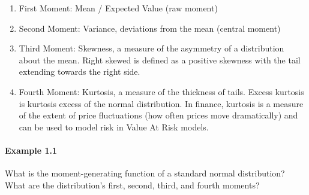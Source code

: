 \documentclass{article}
\begin{document}
\begin{enumerate}
    \item First Moment: Mean / Expected Value (raw moment)
    \item Second Moment: Variance, deviations from the mean (central moment)
    \item Third Moment: Skewness, a measure of the asymmetry of a distribution about the mean. Right skewed is defined as a positive skewness with the tail extending towards the right side. 
    \item Fourth Moment: Kurtosis, a measure of the thickness of tails. Excess kurtosis is kurtosis excess of the normal distribution. In finance, kurtosis is a measure of the extent of price fluctuations (how often prices move dramatically) and can be used to model risk in Value At Risk models.
\end{enumerate}

\paragraph{Example 1.1}
What is the moment-generating function of a standard normal distribution? What are the distribution's first, second, third, and fourth moments?
\newline
\newline
\end{document}
